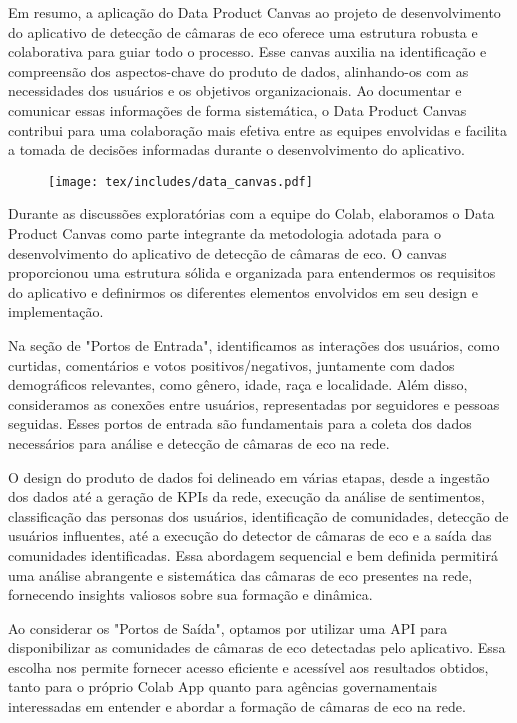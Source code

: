 Em resumo, a aplicação do Data Product Canvas ao projeto de desenvolvimento do aplicativo de detecção de câmaras de eco oferece uma estrutura robusta e colaborativa para guiar todo o processo. Esse canvas auxilia na identificação e compreensão dos aspectos-chave do produto de dados, alinhando-os com as necessidades dos usuários e os objetivos organizacionais. Ao documentar e comunicar essas informações de forma sistemática, o Data Product Canvas contribui para uma colaboração mais efetiva entre as equipes envolvidas e facilita a tomada de decisões informadas durante o desenvolvimento do aplicativo.

\begin{figure}[!htb]
	\label{fig:data_canvas}
	\centering
	\texttt{[image: tex/includes/data\_canvas.pdf]}
	\fautor
\end{figure}

Durante as discussões exploratórias com a equipe do Colab, elaboramos o Data Product Canvas como parte integrante da metodologia adotada para o desenvolvimento do aplicativo de detecção de câmaras de eco. O canvas proporcionou uma estrutura sólida e organizada para entendermos os requisitos do aplicativo e definirmos os diferentes elementos envolvidos em seu design e implementação.

Na seção de "Portos de Entrada", identificamos as interações dos usuários, como curtidas, comentários e votos positivos/negativos, juntamente com dados demográficos relevantes, como gênero, idade, raça e localidade. Além disso, consideramos as conexões entre usuários, representadas por seguidores e pessoas seguidas. Esses portos de entrada são fundamentais para a coleta dos dados necessários para análise e detecção de câmaras de eco na rede.

O design do produto de dados foi delineado em várias etapas, desde a ingestão dos dados até a geração de KPIs da rede, execução da análise de sentimentos, classificação das personas dos usuários, identificação de comunidades, detecção de usuários influentes, até a execução do detector de câmaras de eco e a saída das comunidades identificadas. Essa abordagem sequencial e bem definida permitirá uma análise abrangente e sistemática das câmaras de eco presentes na rede, fornecendo insights valiosos sobre sua formação e dinâmica.

Ao considerar os "Portos de Saída", optamos por utilizar uma API para disponibilizar as comunidades de câmaras de eco detectadas pelo aplicativo. Essa escolha nos permite fornecer acesso eficiente e acessível aos resultados obtidos, tanto para o próprio Colab App quanto para agências governamentais interessadas em entender e abordar a formação de câmaras de eco na rede.

